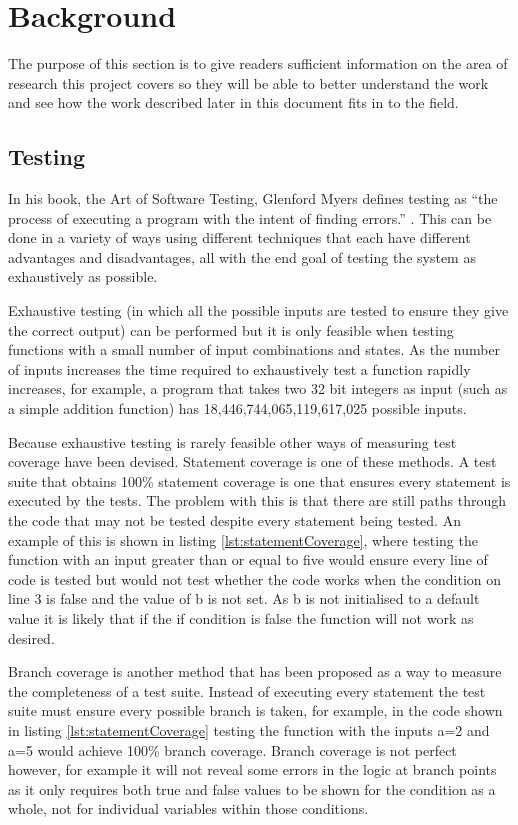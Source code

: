 \documentclass[authoryearcitations]{UoYCSproject}
\begin{document}
\chapter{Background}
\label{cha:Background}

The purpose of this section is to give readers sufficient information on the area of research this project covers so they will be able to better understand the work and see how the work described later in this document fits in to the field.

\section{Testing}
In his book, the Art of Software Testing, Glenford Myers defines testing as ``the process of executing a program with the intent of finding errors.'' \cite{Myers04}. This can be done in a variety of ways using different techniques that each have different advantages and disadvantages, all with the end goal of testing the system as exhaustively as possible.

Exhaustive testing (in which all the possible inputs are tested to ensure they give the correct output) can be performed but it is only feasible when testing functions with a small number of input combinations and states. As the number of inputs increases the time required to exhaustively test a function rapidly increases, for example, a program that takes two 32 bit integers as input (such as a simple addition function) has 18,446,744,065,119,617,025 possible inputs.

Because exhaustive testing is rarely feasible other ways of measuring test coverage have been devised. Statement coverage is one of these methods. A test suite that obtains 100\% statement coverage is one that ensures every statement is executed by the tests. The problem with this is that there are still paths through the code that may not be tested despite every statement being tested. An example of this is shown in listing \ref{lst:statementCoverage}, where testing the function with an input greater than or equal to five would ensure every line of code is tested but would not test whether the code works when the condition on line 3 is false and the value of b is not set. As b is not initialised to a default value it is likely that if the if condition is false the function will not work as desired.

Branch coverage is another method that has been proposed as a way to measure the completeness of a test suite. Instead of executing every statement the test suite must ensure every possible branch is taken, for example, in the code shown in listing \ref{lst:statementCoverage} testing the function with the inputs a=2 and a=5 would achieve 100\% branch coverage. Branch coverage is not perfect however, for example it will not reveal some errors in the logic at branch points as it only requires both true and false values to be shown for the condition as a whole, not for individual variables within those conditions.
\end{document}

